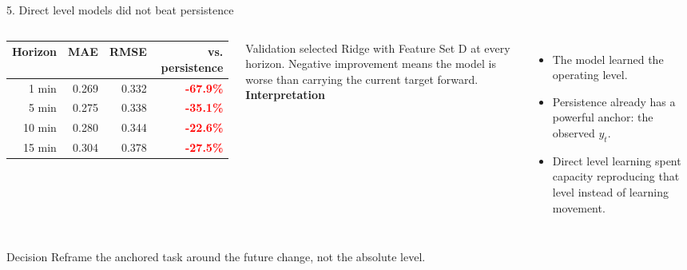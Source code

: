 \documentclass[10pt,aspectratio=169]{beamer}
\newcommand{\bad}[1]{\textcolor{Red}{\textbf{#1}}}
\newcommand{\smallnote}[1]{{\scriptsize\color{Gray}#1}}
\begin{document}
\begin{frame}{5. Direct level models did not beat persistence}
  \begin{columns}[T,onlytextwidth]
      \small
      \begin{tabular}{rrrr}
        \toprule
        Horizon & MAE & RMSE & vs. persistence \\
        \midrule
        1 min  & 0.269 & 0.332 & \bad{-67.9\%} \\
        5 min  & 0.275 & 0.338 & \bad{-35.1\%} \\
        10 min & 0.280 & 0.344 & \bad{-22.6\%} \\
        15 min & 0.304 & 0.378 & \bad{-27.5\%} \\
        \bottomrule
      \end{tabular}
      \vspace{0.2cm}

      \smallnote{Validation selected Ridge with Feature Set D at every horizon. Negative improvement means the model is worse than carrying the current target forward.}
      \textbf{Interpretation}
      \begin{itemize}
        \item The model learned the operating level.
        \item Persistence already has a powerful anchor: the observed $y_t$.
        \item Direct level learning spent capacity reproducing that level instead of learning movement.
      \end{itemize}
  \end{columns}

  \vfill
  \begin{block}{Decision}
    Reframe the anchored task around the future change, not the absolute level.
  \end{block}
\end{frame}
\end{document}
